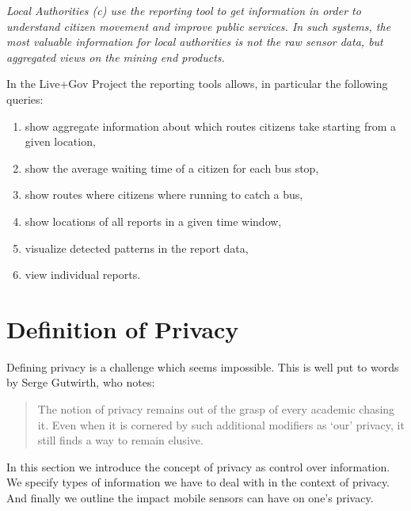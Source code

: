 \documentclass[runningheads,a4paper]{llncs}
\newcommand{\TODO}[1]{\begin{alltt}\textcolor{magenta}{TODO: #1}\end{alltt}}
\newenvironment{LGContent}
{ \par\color{blue} \it \small }
{ \par }
\begin{document}
\begin{LGContent}
\textit{Local Authorities} (c) use the reporting tool to get information in order to understand citizen movement and improve public services.
In such systems, the most valuable information for local authorities is not the raw sensor data, but aggregated views on the mining end products.

In the Live+Gov Project the reporting tools allows, in particular the following queries:
\begin{enumerate}
\item show aggregate information about which routes citizens take starting from a given location,
\item show the average waiting time of a citizen for each bus stop,
\item show routes where citizens where running to catch a bus,
\item show locations of all reports in a given time window,
\item visualize detected patterns in the report data,
\item view individual reports.
\end{enumerate}
\end{LGContent}



\section{Definition of Privacy}
\label{sec:privacydef}


\noindent
Defining privacy is a challenge which seems impossible. This is well put to words by Serge Gutwirth, who notes:
\begin{quote}
The notion of privacy remains out of the grasp of every academic chasing it. Even when it is cornered by such additional modifiers as `our' privacy, it still finds a way to remain elusive. \cite{Gutwirth}
\end{quote}
In this section we introduce the concept of privacy as control over information.
We specify types of information we have to deal with in the context of privacy.
And finally we outline the impact mobile sensors can have on one's privacy.
\end{document}
